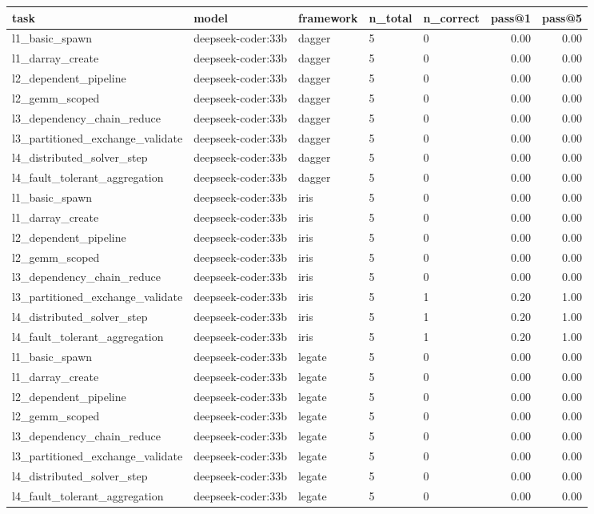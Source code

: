 \begin{tabular}{lllllrr}
\hline
task & model & framework & n_total & n_correct & pass@1 & pass@5 \\
\hline
l1_basic_spawn & deepseek-coder:33b & dagger & 5 & 0 & 0.00 & 0.00 \\
l1_darray_create & deepseek-coder:33b & dagger & 5 & 0 & 0.00 & 0.00 \\
l2_dependent_pipeline & deepseek-coder:33b & dagger & 5 & 0 & 0.00 & 0.00 \\
l2_gemm_scoped & deepseek-coder:33b & dagger & 5 & 0 & 0.00 & 0.00 \\
l3_dependency_chain_reduce & deepseek-coder:33b & dagger & 5 & 0 & 0.00 & 0.00 \\
l3_partitioned_exchange_validate & deepseek-coder:33b & dagger & 5 & 0 & 0.00 & 0.00 \\
l4_distributed_solver_step & deepseek-coder:33b & dagger & 5 & 0 & 0.00 & 0.00 \\
l4_fault_tolerant_aggregation & deepseek-coder:33b & dagger & 5 & 0 & 0.00 & 0.00 \\
l1_basic_spawn & deepseek-coder:33b & iris & 5 & 0 & 0.00 & 0.00 \\
l1_darray_create & deepseek-coder:33b & iris & 5 & 0 & 0.00 & 0.00 \\
l2_dependent_pipeline & deepseek-coder:33b & iris & 5 & 0 & 0.00 & 0.00 \\
l2_gemm_scoped & deepseek-coder:33b & iris & 5 & 0 & 0.00 & 0.00 \\
l3_dependency_chain_reduce & deepseek-coder:33b & iris & 5 & 0 & 0.00 & 0.00 \\
l3_partitioned_exchange_validate & deepseek-coder:33b & iris & 5 & 1 & 0.20 & 1.00 \\
l4_distributed_solver_step & deepseek-coder:33b & iris & 5 & 1 & 0.20 & 1.00 \\
l4_fault_tolerant_aggregation & deepseek-coder:33b & iris & 5 & 1 & 0.20 & 1.00 \\
l1_basic_spawn & deepseek-coder:33b & legate & 5 & 0 & 0.00 & 0.00 \\
l1_darray_create & deepseek-coder:33b & legate & 5 & 0 & 0.00 & 0.00 \\
l2_dependent_pipeline & deepseek-coder:33b & legate & 5 & 0 & 0.00 & 0.00 \\
l2_gemm_scoped & deepseek-coder:33b & legate & 5 & 0 & 0.00 & 0.00 \\
l3_dependency_chain_reduce & deepseek-coder:33b & legate & 5 & 0 & 0.00 & 0.00 \\
l3_partitioned_exchange_validate & deepseek-coder:33b & legate & 5 & 0 & 0.00 & 0.00 \\
l4_distributed_solver_step & deepseek-coder:33b & legate & 5 & 0 & 0.00 & 0.00 \\
l4_fault_tolerant_aggregation & deepseek-coder:33b & legate & 5 & 0 & 0.00 & 0.00 \\
\hline
\end{tabular}
